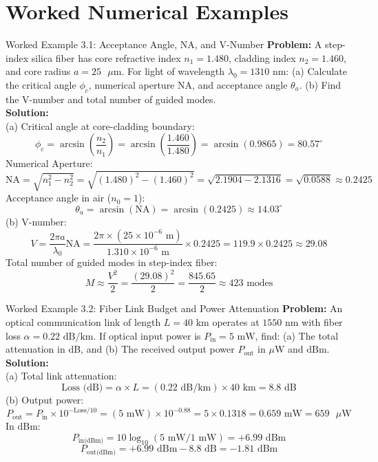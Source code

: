 \section{Worked Numerical Examples}

\begin{examplebox}{Worked Example 3.1: Acceptance Angle, NA, and V-Number}
\textbf{Problem:} A step-index silica fiber has core refractive index $n_1 = 1.480$, cladding index $n_2 = 1.460$, and core radius $a = 25\text{ }\mu\text{m}$. For light of wavelength $\lambda_0 = 1310\text{ nm}$: (a) Calculate the critical angle $\phi_c$, numerical aperture $\text{NA}$, and acceptance angle $\theta_a$. (b) Find the V-number and total number of guided modes.\\
\textbf{Solution:}\\
(a) Critical angle at core-cladding boundary:
\[
\phi_c = \arcsin\left(\frac{n_2}{n_1}\right) = \arcsin\left(\frac{1.460}{1.480}\right) = \arcsin(0.9865) = 80.57^\circ
\]
Numerical Aperture:
\[
\text{NA} = \sqrt{n_1^2 - n_2^2} = \sqrt{(1.480)^2 - (1.460)^2} = \sqrt{2.1904 - 2.1316} = \sqrt{0.0588} \approx 0.2425
\]
Acceptance angle in air ($n_0 = 1$):
\[
\theta_a = \arcsin(\text{NA}) = \arcsin(0.2425) \approx 14.03^\circ
\]
(b) V-number:
\[
V = \frac{2\pi a}{\lambda_0}\text{NA} = \frac{2\pi \times (25 \times 10^{-6}\text{ m})}{1.310 \times 10^{-6}\text{ m}} \times 0.2425 = 119.9 \times 0.2425 \approx 29.08
\]
Total number of guided modes in step-index fiber:
\[
M \approx \frac{V^2}{2} = \frac{(29.08)^2}{2} = \frac{845.65}{2} \approx 423\text{ modes}
\]
\end{examplebox}

\begin{examplebox}{Worked Example 3.2: Fiber Link Budget and Power Attenuation}
\textbf{Problem:} An optical communication link of length $L = 40\text{ km}$ operates at $1550\text{ nm}$ with fiber loss $\alpha = 0.22\text{ dB/km}$. If optical input power is $P_{\text{in}} = 5\text{ mW}$, find: (a) The total attenuation in dB, and (b) The received output power $P_{\text{out}}$ in $\mu\text{W}$ and $\text{dBm}$.\\
\textbf{Solution:}\\
(a) Total link attenuation:
\[
\text{Loss (dB)} = \alpha \times L = (0.22\text{ dB/km}) \times 40\text{ km} = 8.8\text{ dB}
\]
(b) Output power:
\[
P_{\text{out}} = P_{\text{in}} \times 10^{-\text{Loss}/10} = (5\text{ mW}) \times 10^{-0.88} = 5 \times 0.1318 = 0.659\text{ mW} = 659\text{ }\mu\text{W}
\]
In $\text{dBm}$:
\[
P_{\text{in(dBm)}} = 10\log_{10}(5\text{ mW} / 1\text{ mW}) = +6.99\text{ dBm}
\]
\[
P_{\text{out(dBm)}} = +6.99\text{ dBm} - 8.8\text{ dB} = -1.81\text{ dBm}
\]
\end{examplebox}

